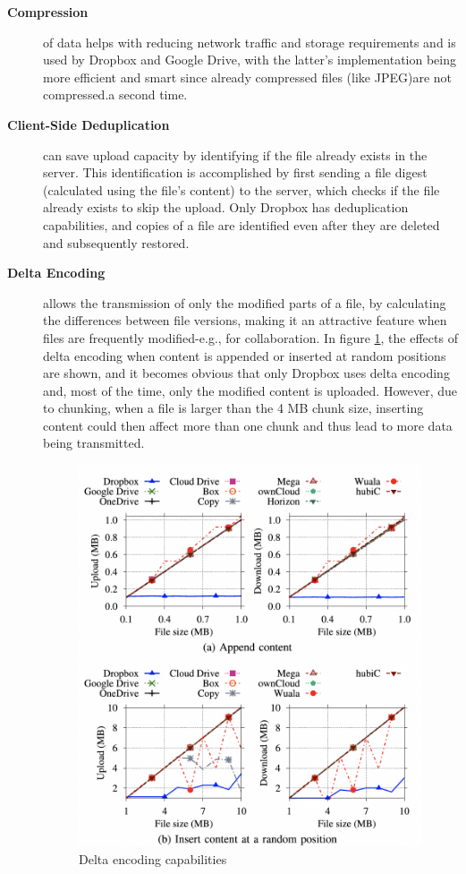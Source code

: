 \begin{description}
	\item[\textbf{Compression}] of data helps with reducing network traffic and storage requirements and is used by Dropbox and Google Drive, with the latter's implementation being more efficient and smart since already compressed files (like JPEG)are not compressed.a second time.
	
	\item[\textbf{Client-Side Deduplication}] can save upload capacity by identifying if the file already exists in the server. This identification is accomplished by first sending a file digest (calculated using the file's content) to the server, which checks if the file already exists to skip the upload.  Only Dropbox has deduplication capabilities, and copies of a file are identified even after they are deleted and subsequently restored.
	
	\item[\textbf{Delta Encoding}] allows the transmission of only the modified parts of a file, by calculating the differences between file versions, making it an attractive feature when files are frequently modified-e.g., for collaboration.  In figure  \ref{fig:delta encoding}, the effects of delta encoding when content is appended or inserted at random positions are shown, and it becomes obvious that only Dropbox uses delta encoding and, most of the time, only the modified content is uploaded. However, due to chunking, when a file is larger than the 4 MB chunk size, inserting content could then affect more than one chunk and thus lead to more data being transmitted.
	
		\begin{figure} [h]
		\centering
		\includegraphics[scale=0.7]{images/delta_encoding}
		\caption{\label{fig:delta encoding}Delta encoding capabilities}
	\end{figure} 
	

\end{description}
